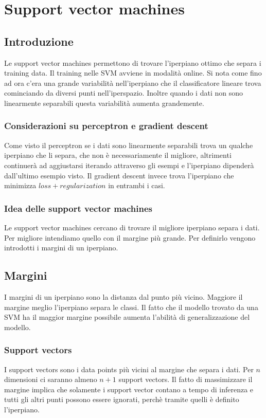 \chapter{Support vector machines}

\section{Introduzione}
Le support vector machines permettono di trovare l'iperpiano ottimo che separa i training data. Il training nelle SVM avviene in modalità online.
Si nota come fino ad ora c'era una grande variabilit\`a nell'iperpiano che il classificatore lineare trova cominciando da diversi punti nell'iperspazio.
Inoltre quando i dati non sono linearmente separabili questa variabilit\`a aumenta grandemente.

	\subsection{Considerazioni su perceptron e gradient descent}
	Come visto il perceptron se i dati sono linearmente separabili trova un qualche iperpiano che li separa, che non \`e necessariamente il migliore, altrimenti continuer\`a ad aggiustarsi iterando attraverso gli esempi e l'iperpiano dipender\`a dall'ultimo esempio visto.
	Il gradient descent invece trova l'iperpiano che minimizza $loss+regularization$ in entrambi i casi.

	\subsection{Idea delle support vector machines}
	Le support vector machines cercano di trovare il migliore iperpiano separa i dati. Per migliore intendiamo quello con il margine pi\`u grande.
	Per definirlo vengono introdotti i margini di un iperpiano.

\section{Margini}
I margini di un iperpiano sono la distanza dal punto pi\`u vicino.
Maggiore il margine meglio l'iperpiano separa le classi.
Il fatto che il modello trovato da una SVM ha il maggior margine possibile aumenta l'abilit\`a di generalizzazione del modello.

	\subsection{Support vectors}
	I support vectors sono i data points pi\`u vicini al margine che separa i dati.
	Per $n$ dimensioni ci saranno almeno $n+1$ support vectors.
	Il fatto di massimizzare il margine implica che solamente i support vector contano a tempo di inferenza e tutti gli altri punti possono essere ignorati, perch\`e tramite quelli \`e definito l'iperpiano.

